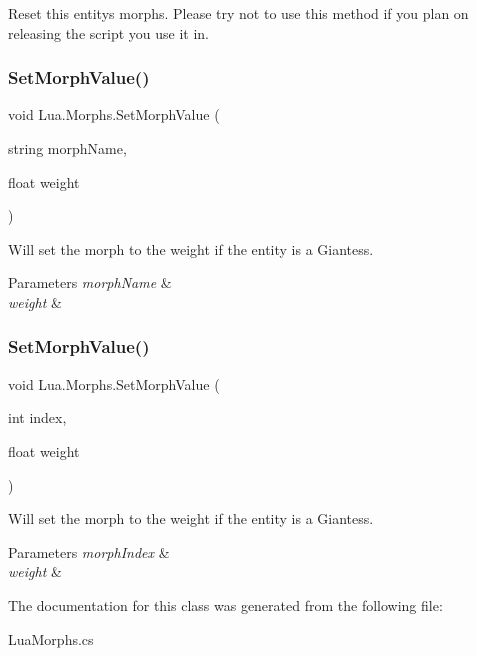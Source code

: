 Reset this entity\textquotesingle{}s morphs. Please try not to use this method if you plan on releasing the script you use it in. 

\mbox{\label{class_lua_1_1_morphs_aefc93668891557c3c980857b3ee6aa0b}} 
\subsubsection{\texorpdfstring{SetMorphValue()}{SetMorphValue()}\hspace{0.1cm}{\footnotesize\ttfamily [1/2]}}
{\footnotesize\ttfamily void Lua.\+Morphs.\+Set\+Morph\+Value (\begin{DoxyParamCaption}\item[{string}]{morph\+Name,  }\item[{float}]{weight }\end{DoxyParamCaption})}



Will set the morph to the weight if the entity is a Giantess. 


\begin{DoxyParams}{Parameters}
{\em morph\+Name} & \\
\hline
{\em weight} & \\
\hline
\end{DoxyParams}
\mbox{\label{class_lua_1_1_morphs_a55a34c72668e0bd4ec86865163a89bd0}} 
\subsubsection{\texorpdfstring{SetMorphValue()}{SetMorphValue()}\hspace{0.1cm}{\footnotesize\ttfamily [2/2]}}
{\footnotesize\ttfamily void Lua.\+Morphs.\+Set\+Morph\+Value (\begin{DoxyParamCaption}\item[{int}]{index,  }\item[{float}]{weight }\end{DoxyParamCaption})}



Will set the morph to the weight if the entity is a Giantess. 


\begin{DoxyParams}{Parameters}
{\em morph\+Index} & \\
\hline
{\em weight} & \\
\hline
\end{DoxyParams}


The documentation for this class was generated from the following file\+:\begin{DoxyCompactItemize}
\item 
Lua\+Morphs.\+cs\end{DoxyCompactItemize}

